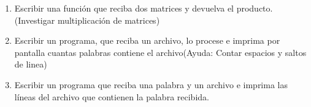 \documentclass[11pt,twoside,a4paper]{article}
\begin{document}
\begin{enumerate}
		\item Escribir una función que reciba dos matrices y devuelva el producto.(Investigar multiplicación de matrices)

		\item Escribir un programa, que reciba un archivo, lo procese e imprima por pantalla cuantas palabras contiene el archivo(Ayuda: Contar espacios y saltos de linea)

		\item Escribir un programa que reciba una palabra y un archivo e imprima las líneas del archivo que contienen la palabra recibida.

	\end{enumerate}
\end{document}
